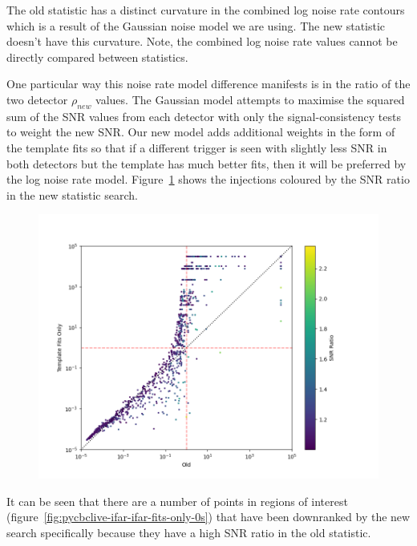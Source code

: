 %
The old statistic has a distinct curvature in the combined log noise rate contours which is a result of the Gaussian noise model we are using. The new statistic doesn't have this curvature. Note, the combined log noise rate values cannot be directly compared between statistics.

One particular way this noise rate model difference manifests is in the ratio of the two detector $\rho_{new}$ values. The Gaussian model attempts to maximise the squared sum of the SNR values from each detector with only the signal-consistency tests to weight the new SNR. Our new model adds additional weights in the form of the template fits so that if a different trigger is seen with slightly less SNR in both detectors but the template has much better fits, then it will be preferred by the log noise rate model. Figure~\ref{fig:pycbclive-ifar-ifar-snr-ratio} shows the injections coloured by the SNR ratio in the new statistic search.
%
\begin{figure}
  \centering
  \begin{minipage}[t]{1.0\linewidth}
    \includegraphics[width=1\textwidth]{images/pycbclive/ifar_vs_ifar_snr_ratio_new.png}
  \end{minipage}
  \caption{}
  \label{fig:pycbclive-ifar-ifar-snr-ratio}
\end{figure}
%
It can be seen that there are a number of points in regions of interest (figure~\ref{fig:pycbclive-ifar-ifar-fits-only-0s}) that have been downranked by the new search specifically because they have a high SNR ratio in the old statistic.

